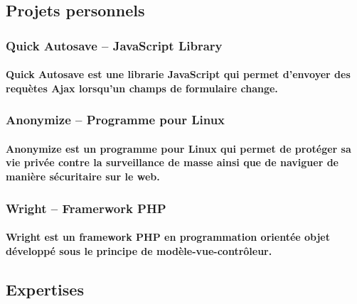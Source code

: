 \documentclass{resume}
\begin{document}
	\vspace{2.5mm}

	\begin{multicols}{2}
		\subsection*{Projets personnels}
			\subsubsection*{Quick Autosave – JavaScript Library}
			\paragraph{Quick Autosave est une librarie JavaScript qui permet d'envoyer des requètes Ajax lorsqu'un champs de formulaire change.}

			\subsubsection*{Anonymize – Programme pour Linux}
			\paragraph{Anonymize est un programme pour Linux qui permet de protéger sa vie privée contre la surveillance de masse ainsi que de naviguer de manière sécuritaire sur le web.}

			\subsubsection*{Wright – Framerwork PHP}
			\paragraph{Wright est un framework PHP en programmation orientée objet développé sous le principe de modèle-vue-contrôleur.}

		\columnbreak

		\subsection*{Expertises}

		{\setlength\multicolsep{0pt}
		 \begin{multicols}{2}

\end{multicols}}
\end{multicols}
\end{document}
